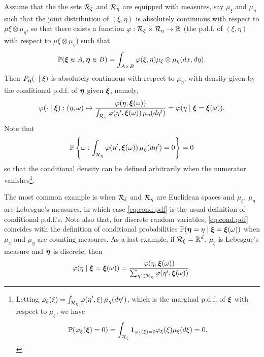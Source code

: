 Assume that the the sets ${\mathcal R}_\xi$ and ${\mathcal R}_\eta$ are equipped with measures, say $\mu_\xi$ and $\mu_\eta$ such that the joint distribution of $(\xi,  \eta)$ is absolutely continuous with respect to $\mu\xi\otimes \mu_\eta$, so that there exists a function $\varphi:{\mathcal R}_\xi\times {\mathcal R}_\eta\to {\mathbb{R}}$ (the p.d.f. of $(\xi, \eta)$ with respect to $\mu\xi\otimes \mu_\eta$) such that 
\[
\bm{\mathbb P}({\bm{\xi}}\in A, {\bm{\eta}}\in B) = \int_{A\times B} \varphi(\xi, \eta) \mu_\xi\otimes \mu_\eta(dx, d\eta).
\]
Then $P_{\bm{\eta}}(\cdot\mid \xi)$ is absolutely continuous with respect to $\mu_\eta$, with density given by the conditional p.d.f. of ${\bm{\eta}}$ given ${\bm{\xi}}$, namely,
\begin{equation}
\label{eq:cond.pdf}
\varphi(\cdot\mid {\bm{\xi}}): (\eta, \omega) \mapsto \frac{\varphi(\eta, {\bm{\xi}}(\omega))}{\int_{{\mathcal R}_\eta} \varphi(\eta',{\bm{\xi}}(\omega))\, \mu_\eta(d\eta')} = \varphi(\eta\mid {\bm{\xi}}= {\bm{\xi}}(\omega)).
\end{equation}
Note that 
\[
\bm{\mathbb P}\left\{\omega: \int_{{\mathcal R}_\eta} \varphi(\eta',{\bm{\xi}}(\omega))\, \mu_\eta(d\eta') = 0\right \} = 0
\]
so that the conditional density can be defined arbitrarily when the numerator vanishes\footnote{Letting $\varphi_\xi(\xi) = \int_{{\mathcal R}_\eta}\varphi(\eta',\xi)\, \mu_\eta(d\eta')$, which is the marginal p.d.f. of ${\bm{\xi}}$ with respect to $\mu_\xi$, we have
\[
\bm{\mathbb P}(\varphi_\xi({\bm{\xi}})= 0) = \int_{{\mathcal R}_\xi} {\bm 1}_{\varphi_\xi(\xi)= 0} \varphi_\xi(\xi) \mu_\xi(d\xi) = 0.
\] 
}.

The most common example is when ${\mathcal R}_\xi$ and ${\mathcal R}_\eta$ are Euclidean spaces and $\mu_\xi$, $\mu_\eta$ are Lebesgue's measures, in which case \cref{eq:cond.pdf} is the usual definition of conditional p.d.f.'s. Note also that, for discrete random variables, \cref{eq:cond.pdf} coincides with the definition of conditional probabilities $\bm{\mathbb P}({\bm{\eta}} = \eta \mid {\bm{\xi}} = {\bm{\xi}}(\omega))$ when $\mu_x$ and $\mu_\eta$ are counting measures. As a last example, if ${\mathcal R}_\xi = {\mathbb{R}}^d$, $\mu_\xi$ is Lebesgue's measure and ${\bm{\eta}}$ is discrete, then
\[
\varphi(\eta \mid {\bm{\xi}} = {\bm{\xi}}(\omega) ) = \frac{\varphi(\eta, {\bm{\xi}}(\omega))}{\sum_{\eta' \in {\mathcal R}_\eta} \varphi(\eta',{\bm{\xi}}(\omega))}.
\]

